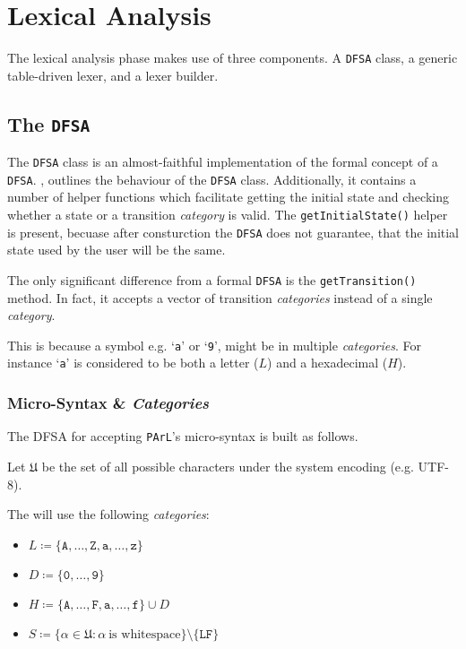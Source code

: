 \section{Lexical Analysis}

The lexical analysis phase makes use of three components. A
\texttt{DFSA} class, a generic table-driven lexer, and a lexer
builder.

\subsection{The \texttt{DFSA}}

The \texttt{DFSA} class is an almost-faithful implementation of
the formal concept of a \texttt{DFSA}. ,
outlines the behaviour of the \texttt{DFSA} class. Additionally,
it contains a number of helper functions which facilitate
getting the initial state and checking whether a state or a
transition \emph{category} is valid. The
\texttt{getInitialState()} helper is present, becuase after
consturction the \texttt{DFSA} does not guarantee, that the
initial state used by the user will be the same.



The only significant difference from a formal \texttt{DFSA} is
the \texttt{getTransition()} method. In fact, it accepts a
vector of transition \emph{categories} instead of a single
\emph{category}.

This is because a symbol e.g. `\texttt{a}' or `\texttt{9}',
might be in multiple \emph{categories}. For instance
`\texttt{a}' is considered to be both a letter ($L$) and a
hexadecimal ($H$).

\subsubsection{Micro-Syntax \& \emph{Categories}}

The DFSA for accepting \texttt{PArL}'s micro-syntax is built as
follows.

Let $\mathfrak{U}$ be the set of all possible characters under
the system encoding (e.g. UTF-8).

The will use the following \emph{categories}:

\begin{itemize}
    \item $L \coloneq \{
        \texttt{A},\ldots,\texttt{Z},\texttt{a},\ldots,\texttt{z}\}$
    \item $D \coloneq
        \{\texttt{0},\ldots,\texttt{9}\}$
    \item $H \coloneq
        \{\texttt{A},\ldots,\texttt{F},\texttt{a},\ldots,\texttt{f}\}
        \cup D$
    \item $S \coloneq \{\alpha \in \mathfrak{U}
        \colon \alpha\ \text{is
    whitespace}\}\setminus\{\texttt{LF}\}$
\end{itemize}

